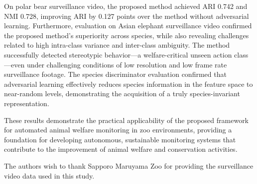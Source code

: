 \documentclass[twocolumn]{svjour3}
\begin{document}
On polar bear surveillance video, the proposed method achieved ARI 0.742 and NMI 0.728, improving ARI by 0.127 points over the method without adversarial learning.
Furthermore, evaluation on Asian elephant surveillance video confirmed the proposed method's superiority across species, while also revealing challenges related to high intra-class variance and inter-class ambiguity.
The method successfully detected stereotypic behavior---a welfare-critical unseen action class---even under challenging conditions of low resolution and low frame rate surveillance footage.
The species discriminator evaluation confirmed that adversarial learning effectively reduces species information in the feature space to near-random levels, demonstrating the acquisition of a truly species-invariant representation.

These results demonstrate the practical applicability of the proposed framework for automated animal welfare monitoring in zoo environments, providing a foundation for developing autonomous, sustainable monitoring systems that contribute to the improvement of animal welfare and conservation activities.

\begin{acknowledgements}
The authors wish to thank Sapporo Maruyama Zoo for providing the surveillance video data used in this study.
\end{acknowledgements}



\end{document}

